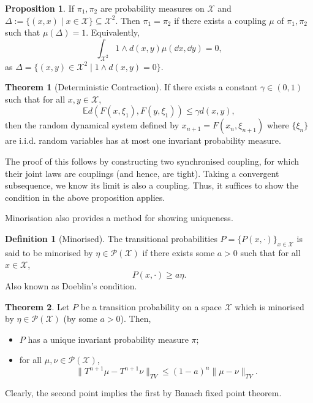 \documentclass[]{article}
\theoremstyle{definition}
\newtheorem*{theorem}{Theorem}
\newtheorem*{definition}{Definition}
\newtheorem*{proposition}{Proposition}
\begin{document}
\begin{proposition}
  If \(\pi_1, \pi_2\) are probability measures on \(\mathcal{X}\) and 
  \(\Delta := \{(x, x) \mid x \in \mathcal{X}\} \subseteq \mathcal{X}^2\). Then 
  \(\pi_1 = \pi_2\) if there exists a coupling \(\mu\) of \(\pi_1, \pi_2\) such 
  that \(\mu(\Delta) = 1\). Equivalently, 
  \[\int_{\mathcal{X}^2} 1 \wedge d(x, y) \mu(\dd x, \dd y) = 0,\]
  as \(\Delta = \{(x, y) \in \mathcal{X}^2 \mid 1 \wedge d(x, y) = 0\}\).
\end{proposition}

\begin{theorem}[Deterministic Contraction]
  If there exists a constant \(\gamma \in (0, 1)\) such that for all \(x, y \in \mathcal{X}\),
  \[\mathbb{E}d(F(x, \xi_1), F(y, \xi_1)) \le \gamma d(x, y),\]
  then the random dynamical system defined by \(x_{n + 1} = F(x_n, \xi_{n + 1})\)
  where \(\{\xi_n\}\) are i.i.d. random variables has at most one invariant probability 
  measure.
\end{theorem}

The proof of this follows by constructing two synchronised coupling, for which 
their joint laws are couplings (and hence, are tight). Taking a convergent subsequence, 
we know its limit is also a coupling. Thus, it suffices to show the condition 
in the above proposition applies.

Minorisation also provides a method for showing uniqueness.

\begin{definition}[Minorised]
  The transitional probabilities \(P = \{P(x, \cdot)\}_{x \in \mathcal{X}}\) is said 
  to be minorised by \(\eta \in \mathcal{P}(\mathcal{X})\) if there exists some 
  \(a > 0\) such that for all \(x \in \mathcal{X}\),
  \[P(x, \cdot) \ge a \eta.\]
  Also known as Doeblin's condition.
\end{definition}

\begin{theorem}
  Let \(P\) be a transition probability on a space \(\mathcal{X}\) which is minorised 
  by \(\eta \in \mathcal{P}(\mathcal{X})\) (by some \(a > 0\)). Then, 
  \begin{itemize}
    \item \(P\) has a unique invariant probability measure \(\pi\);
    \item for all \(\mu, \nu \in \mathcal{P}(\mathcal{X})\), 
      \[\|T^{n + 1}\mu - T^{n + 1}\nu\|_{TV} \le (1 - a)^n \|\mu - \nu\|_{TV}.\]
  \end{itemize}
\end{theorem}
Clearly, the second point implies the first by Banach fixed point theorem.
\end{document}

